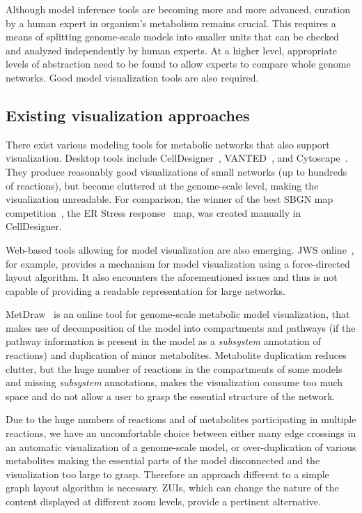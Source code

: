 \documentclass{bmcart}
\begin{document}
Although  model inference tools are becoming more and more advanced, curation by a human expert in organism's metabolism remains crucial. This requires a means of splitting genome-scale models into smaller units that can be checked and analyzed independently by human experts. At a higher level, appropriate levels of abstraction need to be found to allow experts to compare whole genome networks. Good model visualization tools are also required.

\subsection*{Existing visualization approaches}
There exist various modeling tools for metabolic networks that also support visualization. Desktop tools include CellDesigner~\cite{Funahashi2008}, VANTED~\cite{Rohn2012}, and Cytoscape~\cite{Smoot2011}. They produce reasonably good visualizations of small networks (up to hundreds of reactions), but become cluttered at the genome-scale level, making the visualization unreadable. For comparison, the winner of the best SBGN map competition~\cite{SBGN}, the ER Stress response~\cite{Groenendyk2010} map,  was created manually in CellDesigner.

Web-based tools allowing for model visualization are also emerging.  JWS online~\cite{Snoep2003}, for example, provides a mechanism for model visualization using a force-directed layout algorithm. It also encounters the aforementioned issues and thus is not capable of providing a readable representation for large networks.  

MetDraw~\cite{Jensen2014} is an online tool for genome-scale metabolic model visualization, that makes use of decomposition of the model into compartments and pathways (if the pathway information is present in the model as a \emph{subsystem} annotation of reactions) and duplication of minor metabolites. Metabolite duplication reduces clutter, but the huge number of reactions in the compartments of some models and missing \emph{subsystem} annotations, makes the visualization consume too much space and do not allow a user to grasp the essential structure of the network.

Due to the huge numbers of reactions and of metabolites participating in multiple reactions, we have an uncomfortable choice between either many edge crossings in an automatic visualization of a genome-scale model, or over-duplication of various metabolites making the essential parts of the model disconnected and the visualization too large to grasp. Therefore an approach different to a simple graph layout algorithm is necessary. ZUIs, which can change the nature of the content displayed at different zoom levels, provide a pertinent alternative.
\end{document}
